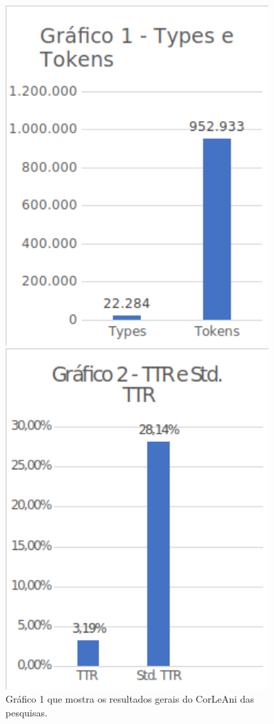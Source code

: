 \documentclass[portuguese]{textolivre}
\begin{document}
\begin{figure}[htbp]
 \centering
 \begin{minipage}{.45\textwidth}
 \includegraphics[width=0.9\textwidth]{Fig34.png}
 \caption{Gráfico 1 que mostra os resultados gerais do CorLeAni das pesquisas.}
 \label{fig34}
 \end{minipage}%
 \qquad
 \begin{minipage}{0.45\textwidth}
 \includegraphics[width=0.9\textwidth]{Graf2.png}

\end{minipage}
\end{figure}
\end{document}
